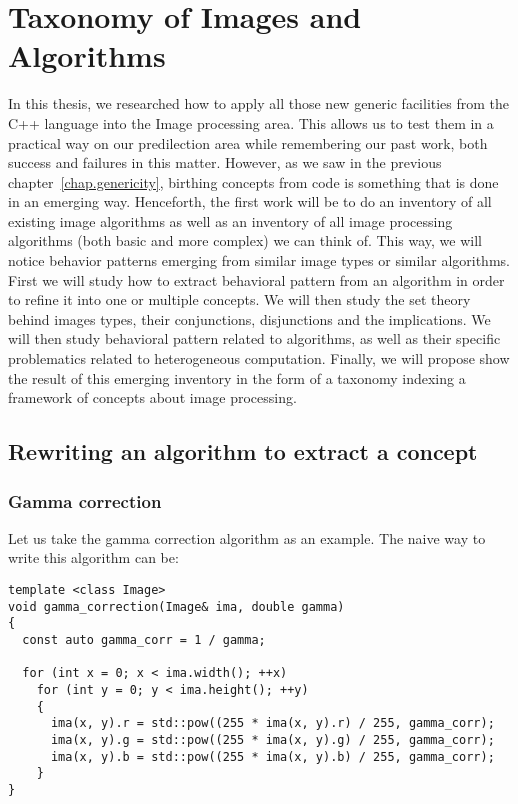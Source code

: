 \chapter{Taxonomy of Images and Algorithms}
\label{chap.image_and_algorithms_taxonomy}

In this thesis, we researched how to apply all those new generic facilities from the C++ language into the Image
processing area. This allows us to test them in a practical way on our predilection area while remembering our past
work, both success and failures in this matter. However, as we saw in the previous chapter~\ref{chap.genericity},
birthing concepts from code is something that is done in an emerging way. Henceforth, the first work will be to do an
inventory of all existing image algorithms as well as an inventory of all image processing algorithms (both basic and
more complex) we can think of. This way, we will notice behavior patterns emerging from similar image types or similar
algorithms. First we will study how to extract behavioral pattern from an algorithm in order to refine it into one or
multiple concepts. We will then study the set theory behind images types, their conjunctions, disjunctions and the
implications. We will then study behavioral pattern related to algorithms, as well as their specific problematics
related to heterogeneous computation. Finally, we will propose show the result of this emerging inventory in the form of
a taxonomy indexing a framework of concepts about image processing.

\section{Rewriting an algorithm to extract a concept}
\label{image_and_algorithms_taxonomy.sec.rewriting}

\subsection{Gamma correction}
\label{image_and_algorithms_taxonomy.rewriting.subsec.gamma}

Let us take the gamma correction algorithm as an example. The naive way to write this algorithm can be:

\begin{verbatim}
template <class Image>
void gamma_correction(Image& ima, double gamma)
{
  const auto gamma_corr = 1 / gamma;

  for (int x = 0; x < ima.width(); ++x)
    for (int y = 0; y < ima.height(); ++y)
    {
      ima(x, y).r = std::pow((255 * ima(x, y).r) / 255, gamma_corr);
      ima(x, y).g = std::pow((255 * ima(x, y).g) / 255, gamma_corr);
      ima(x, y).b = std::pow((255 * ima(x, y).b) / 255, gamma_corr);
    }
}
\end{verbatim}

